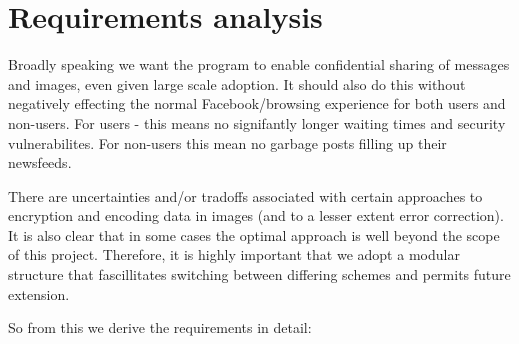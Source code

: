 \section{Requirements analysis}

    Broadly speaking we want the program to enable confidential sharing of messages and images, even given large scale adoption. It should also do this without negatively effecting the normal Facebook/browsing experience for both users and non-users. For users - this means no signifantly longer waiting times and security vulnerabilites. For non-users this mean no garbage posts filling up their newsfeeds.
    
    There are uncertainties and/or tradoffs associated with certain approaches to encryption and encoding data in images (and to a lesser extent error correction). It is also clear that in some cases the optimal approach is well beyond the scope of this project. Therefore, it is highly important that we adopt a modular structure that fascillitates switching between differing schemes and permits future extension.
    
    So from this we derive the requirements in detail:
    
